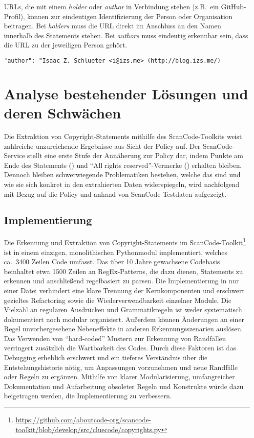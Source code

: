 URLs, die mit einem \textit{holder} oder \textit{author} in Verbindung stehen (z.B.\ ein GitHub-Profil), können zur eindeutigen Identifizierung der Person oder Organisation beitragen.
Bei \textit{holders} muss die URL direkt im Anschluss an den Namen innerhalb des Statements stehen.
Bei \textit{authors} muss eindeutig erkennbar sein, dass die URL zu der jeweiligen Person gehört.

\begin{lstlisting}[keepspaces=true]
"author": "Isaac Z. Schlueter <i@izs.me> (http://blog.izs.me/)
\end{lstlisting}


\section{Analyse bestehender Lösungen und deren Schwächen}\label{sec:analyse-bestehender-losungen}

Die Extraktion von Copyright-Statements mithilfe des ScanCode-Toolkits weist zahlreiche unzureichende Ergebnisse aus Sicht der Policy auf.
Der ScanCode-Service stellt eine erste Stufe der Annäherung zur Policy dar, indem Punkte am Ende des Statements () und \enquote{All rights reserved}-Vermerke () erhalten bleiben.
Dennoch bleiben schwerwiegende Problematiken bestehen, welche das sind und wie sie sich konkret in den extrahierten Daten widerspiegeln, wird nachfolgend mit Bezug auf die Policy und anhand von ScanCode-Testdaten aufgezeigt.

\subsection{Implementierung}

Die Erkennung und Extraktion von Copyright-Statements im ScanCode-Toolkit\footnote{\url{https://github.com/aboutcode-org/scancode-toolkit/blob/develop/src/cluecode/copyrights.py}} ist in einem einzigen, monolithischen Pythonmodul implementiert, welches ca.\ \num{3400} Zeilen Code umfasst.
Das über \num{10} Jahre gewachsene Codebasis beinhaltet etwa \num{1500} Zeilen an RegEx-Patterns, die dazu dienen, Statements zu erkennen und anschließend regelbasiert zu parsen.
Die Implementierung in nur einer Datei verhindert eine klare Trennung der Kernkomponenten und erschwert gezieltes Refactoring sowie die Wiederverwendbarkeit einzelner Module.
Die Vielzahl an regulären Ausdrücken und Grammatikregeln ist weder systematisch dokumentiert noch modular organisiert.
Außerdem können Änderungen an einer Regel unvorhergesehene Nebeneffekte in anderen Erkennungsszenarien auslösen.
Das Verwenden von \enquote{hard-coded} Mustern zur Erkennung von Randfällen verringert zusätzlich die Wartbarkeit des Codes.
Durch diese Faktoren ist das Debugging erheblich erschwert und ein tieferes Verständnis über die Entstehungshistorie nötig, um Anpassungen vorzunehmen und neue Randfälle oder Regeln zu ergänzen.
Mithilfe von klarer Modularisierung, umfangreicher Dokumentation und Aufarbeitung obsoleter Regeln und Konstrukte würde dazu beigetragen werden, die Implementierung zu verbessern.

